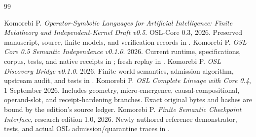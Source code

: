 \documentclass[11pt]{article}
\begin{document}
\clearpage
\begin{thebibliography}{99}

 Komorebi P. \emph{Operator-Symbolic Languages for Artificial Intelligence: Finite Metatheory and Independent-Kernel Draft v0.5}. OSL-Core 0.3, 2026. Preserved manuscript, source, finite models, and verification records in .
 Komorebi P. \emph{OSL-Core 0.5 Semantic Independence v0.1.0}. 2026. Current runtime, specifications, corpus, tests, and native receipts in ; fresh replay in .
 Komorebi P. \emph{OSL Discovery Bridge v0.1.0}. 2026. Finite world semantics, admission algorithm, upstream audit, and tests in .
 Komorebi P. \emph{OSL Complete Lineage with Core 0.4}, 1 September 2026. Includes geometry, micro-emergence, causal-compositional, operand-slot, and receipt-hardening branches. Exact original bytes and hashes are bound by the edition's source ledger.
 Komorebi P. \emph{Finite Semantic Checkpoint Interface}, research edition 1.0, 2026. Newly authored reference demonstrator, tests, and actual OSL admission/quarantine traces in .
\end{thebibliography}
\end{document}
